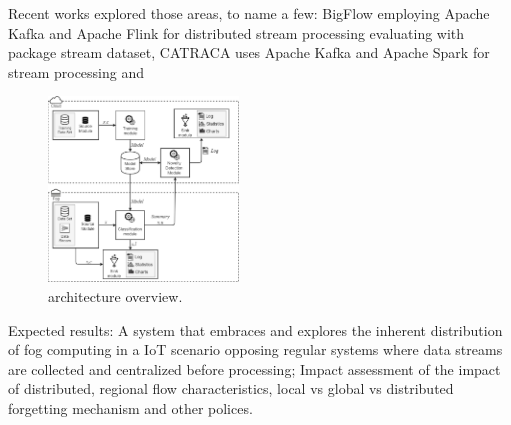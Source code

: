 \documentclass[conference]{IEEEtran}
\begin{document}
Recent works explored those areas, to name a few: BigFlow \cite{Viegas2019}
employing Apache Kafka and Apache Flink for distributed stream processing
evaluating with package stream dataset,
CATRACA \cite{Lopez2018,AndreoniLopez2019a} uses 
Apache Kafka and Apache Spark for stream processing and 






\begin{figure}[htbp]
\centerline{\includegraphics[width=0.45\textwidth]{figures/mfog-arch-v2_en.png}}
\caption{\mfog architecture overview.}
\label{fig:mfog-architecture}
\end{figure}

Expected results:
A system that embraces and explores the inherent distribution of fog computing
in a IoT scenario opposing regular systems where data streams are collected and
centralized before processing;
Impact assessment of the impact of distributed, regional flow characteristics,
local vs global vs distributed forgetting mechanism and other polices.
\end{document}
